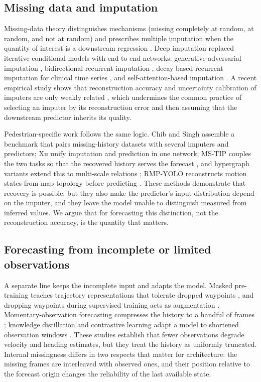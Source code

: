 \subsection{Missing data and imputation}
Missing-data theory distinguishes mechanisms (missing completely at random, at random, and not at random) and prescribes multiple imputation when the quantity of interest is a downstream regression \cite{little2019missing,vanbuuren2018flexible}. Deep imputation replaced iterative conditional models with end-to-end networks: generative adversarial imputation \cite{yoon2018gain}, bidirectional recurrent imputation \cite{cao2018brits}, decay-based recurrent imputation for clinical time series \cite{che2018gru}, and self-attention-based imputation \cite{du2023saits}. A recent empirical study shows that reconstruction accuracy and uncertainty calibration of imputers are only weakly related \cite{hossain2025beyond}, which undermines the common practice of selecting an imputer by its reconstruction error and then assuming that the downstream predictor inherits its quality.

Pedestrian-specific work follows the same logic. Chib and Singh \cite{chib2024pedestrian} assemble a benchmark that pairs missing-history datasets with several imputers and predictors; Xu \etal \cite{xu2023uncovering} unify imputation and prediction in one network; MS-TIP couples the two tasks so that the recovered history serves the forecast \cite{chib2024mstip}, and hypergraph variants extend this to multi-scale relations \cite{chib2026hypergraph}; RMP-YOLO reconstructs motion states from map topology before predicting \cite{sun2025rmpyolo}. These methods demonstrate that recovery is possible, but they also make the predictor's input distribution depend on the imputer, and they leave the model unable to distinguish measured from inferred values. We argue that for forecasting this distinction, not the reconstruction accuracy, is the quantity that matters.

\subsection{Forecasting from incomplete or limited observations}
A separate line keeps the incomplete input and adapts the model. Masked pre-training teaches trajectory representations that tolerate dropped waypoints \cite{yang2023rmp,chen2023trajmae}, and dropping waypoints during supervised training acts as augmentation \cite{chib2023dropping}. Momentary-observation forecasting compresses the history to a handful of frames \cite{sun2022momentary}; knowledge distillation and contrastive learning adapt a model to shortened observation windows \cite{monti2022howmany,qiu2025adapting}. These studies establish that fewer observations degrade velocity and heading estimates, but they treat the history as uniformly truncated. Internal missingness differs in two respects that matter for architecture: the missing frames are interleaved with observed ones, and their position relative to the forecast origin changes the reliability of the last available state.

